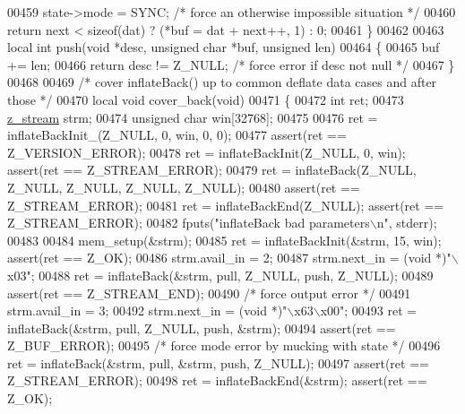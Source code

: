 \begin{DoxyCode}
{{{{{00459         state->mode = SYNC;     \textcolor{comment}{/* force an otherwise impossible situation */}
00460     \textcolor{keywordflow}{return} next < \textcolor{keyword}{sizeof}(dat) ? (*buf = dat + next++, 1) : 0;
00461 \}
00462 
00463 local \textcolor{keywordtype}{int} push(\textcolor{keywordtype}{void} *desc, \textcolor{keywordtype}{unsigned} \textcolor{keywordtype}{char} *buf, \textcolor{keywordtype}{unsigned} len)
00464 \{
00465     buf += len;
00466     \textcolor{keywordflow}{return} desc != Z\_NULL;      \textcolor{comment}{/* force error if desc not null */}
00467 \}
00468 
00469 \textcolor{comment}{/* cover inflateBack() up to common deflate data cases and after those */}
00470 local \textcolor{keywordtype}{void} cover\_back(\textcolor{keywordtype}{void})
00471 \{
00472     \textcolor{keywordtype}{int} ret;
00473     \hyperlink{structz__stream__s}{z\_stream} strm;
00474     \textcolor{keywordtype}{unsigned} \textcolor{keywordtype}{char} win[32768];
00475 
00476     ret = inflateBackInit\_(Z\_NULL, 0, win, 0, 0);
00477                                                 assert(ret == Z\_VERSION\_ERROR);
00478     ret = inflateBackInit(Z\_NULL, 0, win);      assert(ret == Z\_STREAM\_ERROR);
00479     ret = inflateBack(Z\_NULL, Z\_NULL, Z\_NULL, Z\_NULL, Z\_NULL);
00480                                                 assert(ret == Z\_STREAM\_ERROR);
00481     ret = inflateBackEnd(Z\_NULL);               assert(ret == Z\_STREAM\_ERROR);
00482     fputs(\textcolor{stringliteral}{"inflateBack bad parameters\(\backslash\)n"}, stderr);
00483 
00484     mem\_setup(&strm);
00485     ret = inflateBackInit(&strm, 15, win);      assert(ret == Z\_OK);
00486     strm.avail\_in = 2;
00487     strm.next\_in = (\textcolor{keywordtype}{void} *)\textcolor{stringliteral}{"\(\backslash\)x03"};
00488     ret = inflateBack(&strm, pull, Z\_NULL, push, Z\_NULL);
00489                                                 assert(ret == Z\_STREAM\_END);
00490         \textcolor{comment}{/* force output error */}
00491     strm.avail\_in = 3;
00492     strm.next\_in = (\textcolor{keywordtype}{void} *)\textcolor{stringliteral}{"\(\backslash\)x63\(\backslash\)x00"};
00493     ret = inflateBack(&strm, pull, Z\_NULL, push, &strm);
00494                                                 assert(ret == Z\_BUF\_ERROR);
00495         \textcolor{comment}{/* force mode error by mucking with state */}
00496     ret = inflateBack(&strm, pull, &strm, push, Z\_NULL);
00497                                                 assert(ret == Z\_STREAM\_ERROR);
00498     ret = inflateBackEnd(&strm);                assert(ret == Z\_OK);
}}}}}
\end{DoxyCode}
